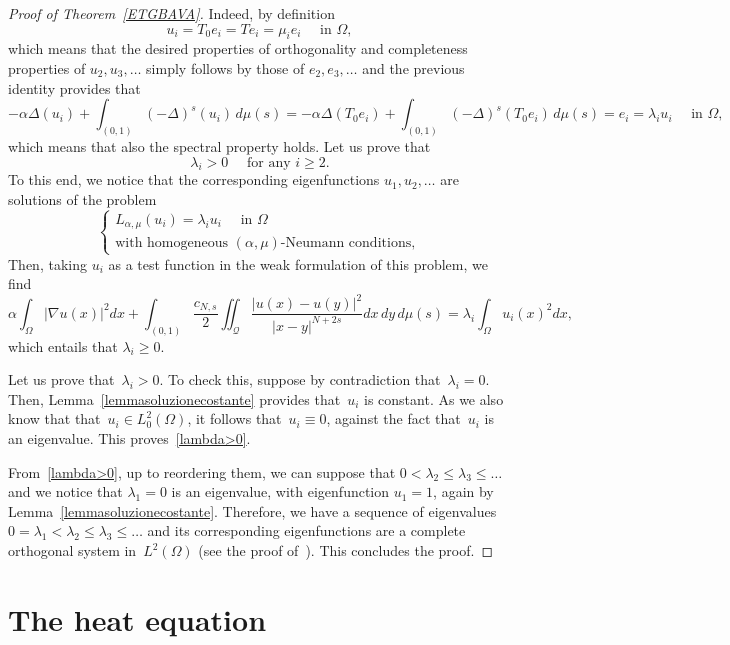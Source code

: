\documentclass[12pt,a4paper,intlimits,sumlimits]{amsart}
\def \Q {\mathcal Q}
\theoremstyle{definition}
\theoremstyle{plain}
\numberwithin{equation}{section}
\renewcommand{\le}{\leqslant}
\renewcommand{\ge}{\geqslant}
\begin{document}
\begin{proof}[Proof of Theorem~\ref{ETGBAVA}]
Indeed, by definition
\[
u_i = T_0 e_i = T e_i = \mu_i e_i\quad\mbox{ in } \Omega,
\]
which means that the desired properties of orthogonality and completeness properties of $u_2, u_3, \dots$ simply follows by those of $e_2, e_3, \dots$ and the previous identity provides that
\[
-\alpha \Delta (u_i) + \int_{(0, 1)} (-\Delta)^s (u_i)\, d\mu(s) =-\alpha \Delta (T_0 e_i)+ \int_{(0, 1)} (-\Delta)^s (T_0 e_i)\, d\mu(s) =e_i =\lambda_i u_i \quad\mbox{ in } \Omega,
\]
which means that also the spectral property holds. Let us prove that
\begin{equation}\label{lambda>0}
\lambda_i >0 \quad\mbox{ for any } i\ge 2.
\end{equation}
To this end, we notice that the corresponding eigenfunctions $u_1, u_2, \dots$ are solutions of  the problem
\[
\begin{cases}
L_{\alpha,\mu}(u_i)=\lambda_i u_i  \quad \mbox{ in } \Omega
\\
\mbox{with homogeneous } (\alpha,\mu)\mbox{-Neumann conditions},
\end{cases}
\]
Then, taking $u_i$ as a test function in the weak formulation of this problem, we find
\begin{equation*}
\alpha \int_\Omega |\nabla u(x)|^2dx +\int_{(0, 1)} \frac{c_{N, s}}{2} \iint_{\Q} \frac{|u(x)-u(y)|^2}{|x-y|^{N+2s}} dx\,dy\, d\mu(s)= \lambda_i \int_\Omega u_i(x)^2 dx,
\end{equation*}
which entails that $\lambda_i\ge 0$.  

Let us prove that~$\lambda_i>0$. To check this, suppose by contradiction that~$\lambda_i=0$. Then, Lemma~\ref{lemmasoluzionecostante} provides that~$u_i$ is constant. As we also know that that~$u_i\in L^2_0(\Omega)$, it follows that~$u_i\equiv 0$, against the fact that~$u_i$ is an eigenvalue.  This proves~\eqref{lambda>0}.

{F}rom~\eqref{lambda>0}, up to reordering them, we can suppose that $0<\lambda_2\le\lambda_3\le\dots$ and we
notice that $\lambda_1=0$ is an eigenvalue, with eigenfunction $u_1= 1$,  again by Lemma~\ref{lemmasoluzionecostante}.
Therefore, we have a sequence of eigenvalues $0 =\lambda_1 <\lambda_2\le\lambda_3\le\dots$ and its corresponding eigenfunctions are a complete orthogonal system in~$L^2(\Omega)$ (see the proof of~\cite[Theorem 3.11 ]{MR3651008}).
This concludes the proof.
\end{proof}

\section{The heat equation}\label{KDMCLDFMVV2}
\end{document}
